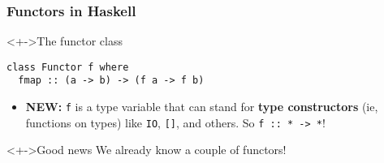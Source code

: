 \documentclass{beamer}
\begin{document}
\begin{frame}[fragile]
  \frametitle{Functors in Haskell}
\begin{alertblock}<+->{The functor class}
\begin{lstlisting}
class Functor f where
  fmap :: (a -> b) -> (f a -> f b)
\end{lstlisting}
    \begin{itemize}
  \item \alert{\textbf{NEW:}} \texttt{f} is a type variable that can
    stand for \textbf{type
      constructors} (ie, functions on types) like  \texttt{IO},
    \texttt{[]}, and others.  So \lstinline$f :: * -> *$!
  \end{itemize}
\end{alertblock}
\begin{exampleblock}<+->{Good news}
  We already know a couple of functors!
\end{exampleblock}
\end{frame}
\end{document}
